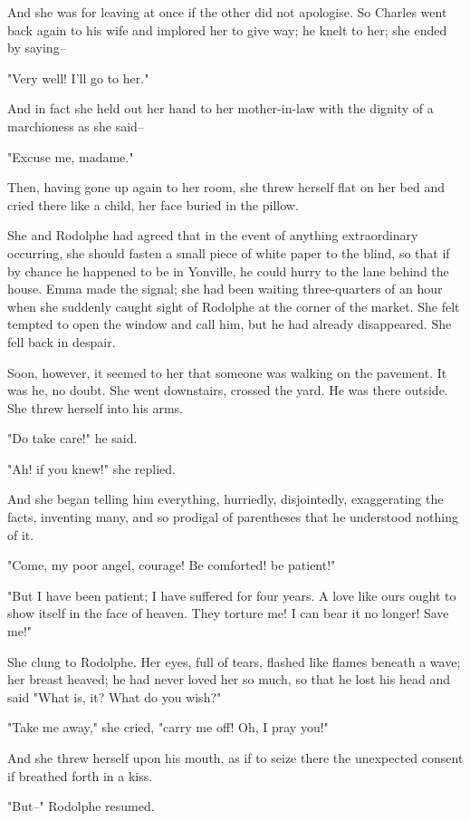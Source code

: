 \documentclass[11pt,twocolumn]{ltugboat}
\begin{document}
And she was for leaving at once if the other did not apologise. So
Charles went back again to his wife and implored her to give way; he
knelt to her; she ended by saying--

"Very well! I'll go to her."

And in fact she held out her hand to her mother-in-law with the dignity
of a marchioness as she said--

"Excuse me, madame."

Then, having gone up again to her room, she threw herself flat on her
bed and cried there like a child, her face buried in the pillow.

She and Rodolphe had agreed that in the event of anything extraordinary
occurring, she should fasten a small piece of white paper to the blind,
so that if by chance he happened to be in Yonville, he could hurry to
the lane behind the house. Emma made the signal; she had been waiting
three-quarters of an hour when she suddenly caught sight of Rodolphe at
the corner of the market. She felt tempted to open the window and call
him, but he had already disappeared. She fell back in despair.

Soon, however, it seemed to her that someone was walking on the
pavement. It was he, no doubt. She went downstairs, crossed the yard. He
was there outside. She threw herself into his arms.

"Do take care!" he said.

"Ah! if you knew!" she replied.

And she began telling him everything, hurriedly, disjointedly,
exaggerating the facts, inventing many, and so prodigal of parentheses
that he understood nothing of it.

"Come, my poor angel, courage! Be comforted! be patient!"

"But I have been patient; I have suffered for four years. A love like
ours ought to show itself in the face of heaven. They torture me! I can
bear it no longer! Save me!"

She clung to Rodolphe. Her eyes, full of tears, flashed like flames
beneath a wave; her breast heaved; he had never loved her so much, so
that he lost his head and said "What is, it? What do you wish?"

"Take me away," she cried, "carry me off! Oh, I pray you!"

And she threw herself upon his mouth, as if to seize there the
unexpected consent if breathed forth in a kiss.

"But--" Rodolphe resumed.
\end{document}

